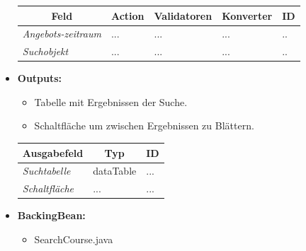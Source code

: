 \begin{itemize}
\begin{center}
\begin{longtable}{|p{3cm} |p{4cm} | p{4cm}|p{3cm} |p{2cm}|}
						\hline \multicolumn{1}{|c|}{\textbf{Feld}} & \multicolumn{1}{|c|}{\textbf{Action}} & \multicolumn{1}{|c|}{\textbf{Validatoren}}  &  \multicolumn{1}{|c|}{\textbf{Konverter}} &  \multicolumn{1}{|c|}{\textbf{ID}} \\ \hline
						\endfirsthead
						\hline
						\endlastfoot
						\textit{Angebots-zeitraum} & ... & ... & ... & ..\\ \hline
						\textit{Suchobjekt} & ... & ... & ... & ..\\ \hline
					\end{longtable}
				\end{center}
			\item \textbf{Outputs:}
			\begin{itemize}
				\item Tabelle mit Ergebnissen der Suche.
				\item Schaltfläche um zwischen Ergebnissen zu Blättern.
			\end{itemize}
					\begin{center}
						\begin{longtable}{|p{5cm} | p{4cm}|p{3cm}|}
							
							\hline \multicolumn{1}{|c|}{\textbf{Ausgabefeld}} & \multicolumn{1}{|c|}{\textbf{Typ}}  &  \multicolumn{1}{|c|}{\textbf{ID}} \\ \hline
							\endfirsthead
							\hline
							\endlastfoot
							\textit{Suchtabelle}  & dataTable & ... \\ \hline
							\textit{Schaltfläche}  & ... & ... \\ \hline
						\end{longtable}
					\end{center}
			\item \textbf{BackingBean:}
			\begin{itemize}
				\item SearchCourse.java
			\end{itemize}
		\end{itemize}
		
